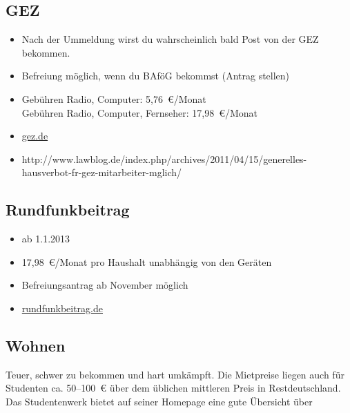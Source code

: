 \subsection{GEZ}
\begin{itemize}
	\item Nach der Ummeldung wirst du wahrscheinlich bald Post von der GEZ bekommen.
	\item Befreiung möglich, wenn du BAföG bekommst (Antrag stellen)
	\item Gebühren Radio, Computer: 5,76~€/Monat \\
Gebühren Radio, Computer, Fernseher: 17,98~€/Monat
        \item \url{gez.de}
        \item http://www.lawblog.de/index.php/archives/2011/04/15/generelles-hausverbot-fr\newline -gez-mitarbeiter-mglich/
\end{itemize}

\subsection{Rundfunkbeitrag}
\begin{itemize}
    \item ab 1.1.2013
    \item 17,98~€/Monat pro Haushalt unabhängig von den Geräten
    \item Befreiungsantrag ab November möglich
    \item \url{rundfunkbeitrag.de}
\end{itemize}

\subsection{Wohnen}
Teuer, schwer zu bekommen und hart umkämpft. Die Mietpreise liegen
auch für Studenten ca. 50--100~€ über dem üblichen mittleren Preis in
Restdeutschland. Das Studentenwerk bietet auf seiner Homepage eine
gute Übersicht über

